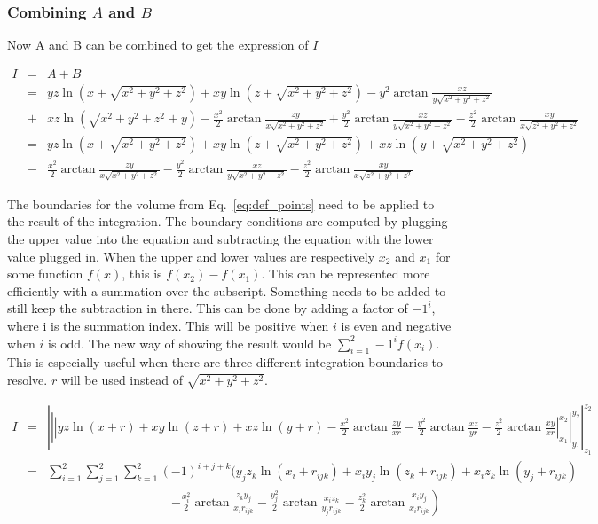 \subsubsection{Combining $A$ and $B$}
Now A and B can be combined to get the expression of $I$ 

\begin{eqnarray}
I&=& A + B \nonumber\\
&=& yz \ln{\left( x + \sqrt{x^2+y^2+z^2} \right)} + 
xy \ln{\left( z + \sqrt{x^2+y^2+z^2} \right)} - 
y^2 \arctan{\frac{xz}{y\sqrt{x^2+y^2+z^2}}} \nonumber\\ 
&+& 
xz \ln{\left( \sqrt{x^2+y^2+z^2}+y \right)} - 
\frac{x^2}{2} \arctan{\frac{zy}{x\sqrt{x^2+y^2+z^2}}} + 
\frac{y^2}{2} \arctan{\frac{xz}{y\sqrt{x^2+y^2+z^2}}} - 
\frac{z^2}{2} \arctan{\frac{xy}{x\sqrt{z^2+y^2+z^2}}} \nonumber\\
&=&
yz \ln{\left( x + \sqrt{x^2+y^2+z^2} \right)} + 
xy \ln{\left( z + \sqrt{x^2+y^2+z^2} \right)} + 
xz \ln{\left( y+\sqrt{x^2+y^2+z^2} \right)} \nonumber\\ 
&-& 
\frac{x^2}{2} \arctan{\frac{zy}{x\sqrt{x^2+y^2+z^2}}} - 
\frac{y^2}{2} \arctan{\frac{xz}{y\sqrt{x^2+y^2+z^2}}} - 
\frac{z^2}{2} \arctan{\frac{xy}{x\sqrt{z^2+y^2+z^2}}} 
\end{eqnarray}

The boundaries for the volume from Eq.~\eqref{eq:def_points} need to be applied to the result of the integration. 
The boundary conditions are computed by plugging the upper value into the equation and subtracting the equation with the lower 
value plugged in. When the upper and lower values are respectively $x_2$ and $x_1$ for some function $f(x)$, this is $f(x_2) - f(x_1)$. 
This can be represented more efficiently with a summation over the subscript. Something needs to be added to still keep the subtraction in there. 
This can be done by adding a factor of $-1^i$, where i is the summation index. This will be positive when $i$ is even and negative when $i$ is odd. 
The new way of showing the result would be $\displaystyle\sum_{i=1}^{2} -1^i f(x_i)$. This is especially useful when there are three different 
integration boundaries to resolve. $r$ will be used instead of $\sqrt{x^2+y^2+z^2}$. 

\begin{eqnarray}
I
&=& \left| \left| \left| 
yz \ln{\left( x + r \right)} + 
xy \ln{\left( z + r \right)} + 
xz \ln{\left( y + r \right)} - 
\frac{x^2}{2} \arctan{\frac{zy}{xr}} - 
\frac{y^2}{2} \arctan{\frac{xz}{yr}} - 
\frac{z^2}{2} \arctan{\frac{xy}{xr}} 
\right|_{x_1}^{x_2} \right|_{y_1}^{y_2} \right|_{z_1}^{z_2} 
\nonumber\\
&=& \sum_{i=1}^{2} \sum_{j=1}^{2} \sum_{k=1}^{2} (-1)^{i+j+k} 
\Bigg(
y_j z_k \ln{\left( x_i + r_{ijk} \right)} + 
x_i y_j \ln{\left( z_k + r_{ijk} \right)} + 
x_i z_k \ln{\left( y_j+r_{ijk} \right)}  \nonumber\\
&& \qquad\qquad\qquad\qquad\qquad \left. - 
\frac{x_i^2}{2} \arctan{\frac{z_k y_j}{x_i r_{ijk}}} - 
\frac{y_j^2}{2} \arctan{\frac{x_i z_k}{y_j r_{ijk}}} - 
\frac{z_k ^2}{2} \arctan{\frac{x_i y_j}{x_i r_{ijk}}} 
\right)
\end{eqnarray} 


